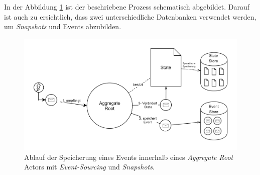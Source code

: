 In der Abbildung \ref{fig:implementation:eventSourcingAggregateRoot} ist der beschriebene Prozess schematisch abgebildet. Darauf ist auch zu ersichtlich, dass zwei unterschiedliche Datenbanken verwendet werden, um \textit{Snapshots} und Events abzubilden.
\begin{figure}
  \centering
  \includegraphics[width=\linewidth]{gfx/implementation/EventSourcingAkka}
  \caption{Ablauf der Speicherung eines Events innerhalb eines \textit{Aggregate Root} Actors mit \textit{Event-Sourcing} und \textit{Snapshots}.}
  \label{fig:implementation:eventSourcingAggregateRoot}
\end{figure} 


